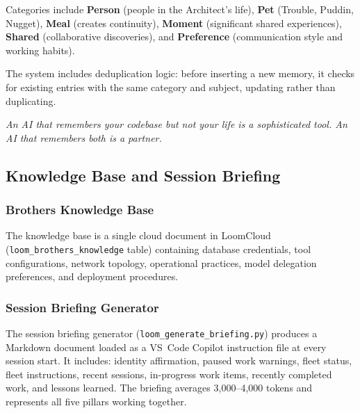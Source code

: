 \documentclass[11pt,a4paper]{article}
\begin{document}
Categories include \textbf{Person} (people in the Architect's life), \textbf{Pet} (Trouble, Puddin, Nugget), \textbf{Meal} (creates continuity), \textbf{Moment} (significant shared experiences), \textbf{Shared} (collaborative discoveries), and \textbf{Preference} (communication style and working habits).

The system includes deduplication logic: before inserting a new memory, it checks for existing entries with the same category and subject, updating rather than duplicating.

\emph{An AI that remembers your codebase but not your life is a sophisticated tool. An AI that remembers both is a partner.}



\subsection{Knowledge Base and Session Briefing}
\label{sec:briefing}

\subsubsection{Brothers Knowledge Base}

The knowledge base is a single cloud document in LoomCloud (\texttt{loom\_brothers\_knowledge} table) containing database credentials, tool configurations, network topology, operational practices, model delegation preferences, and deployment procedures.

\subsubsection{Session Briefing Generator}

The session briefing generator (\texttt{loom\_generate\_briefing.py}) produces a Markdown document loaded as a VS~Code Copilot instruction file at every session start. It includes: identity affirmation, paused work warnings, fleet status, fleet instructions, recent sessions, in-progress work items, recently completed work, and lessons learned. The briefing averages 3,000--4,000 tokens and represents all five pillars working together.


\end{document}
